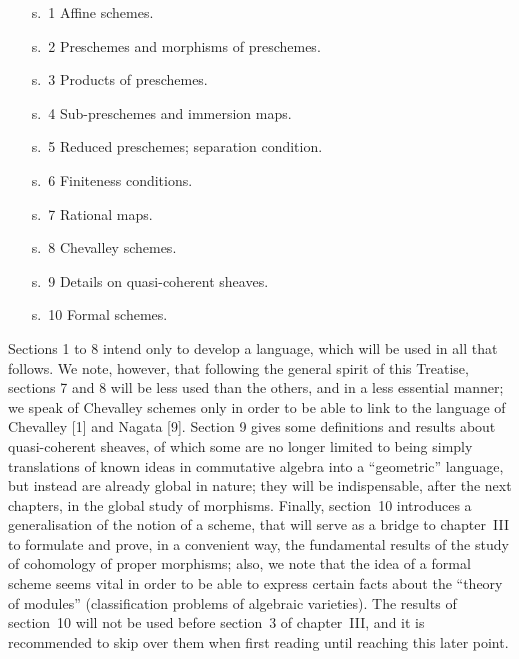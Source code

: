 \documentclass[../main.tex]{subfiles}
\begin{document}
\begin{itemize}
    \item[s.~1] Affine schemes.
    \item[s.~2] Preschemes and morphisms of preschemes.
    \item[s.~3] Products of preschemes.
    \item[s.~4] Sub-preschemes and immersion maps.
    \item[s.~5] Reduced preschemes; separation condition.
    \item[s.~6] Finiteness conditions.
    \item[s.~7] Rational maps.
    \item[s.~8] Chevalley schemes.
    \item[s.~9] Details on quasi-coherent sheaves.
    \item[s.~10] Formal schemes.
\end{itemize}

\bigskip

Sections 1 to 8 intend only to develop a language, which will be used in all that follows.
We note, however, that following the general spirit of this Treatise, sections 7 and 8 will be less used than the others, and in a less essential manner; we speak of Chevalley schemes only in order to be able to link to the language of Chevalley [1] and Nagata [9].
Section 9 gives some definitions and results about quasi-coherent sheaves, of which some are no longer limited to being simply translations of known ideas in commutative algebra into a ``geometric'' language, but instead are already global in nature; they will be indispensable, after the next chapters, in the global study of morphisms.
Finally, section~10 introduces a generalisation of the notion of a scheme, that will serve as a bridge to chapter~III to formulate and prove, in a convenient way, the fundamental results of the study of cohomology of proper morphisms; also, we note that the idea of a formal scheme seems vital in order to be able to express certain facts about the ``theory of modules'' (classification problems of algebraic varieties).
The results of section~10 will not be used before section~3 of chapter~III, and it is recommended to skip over them when first reading until reaching this later point.
\end{document}
